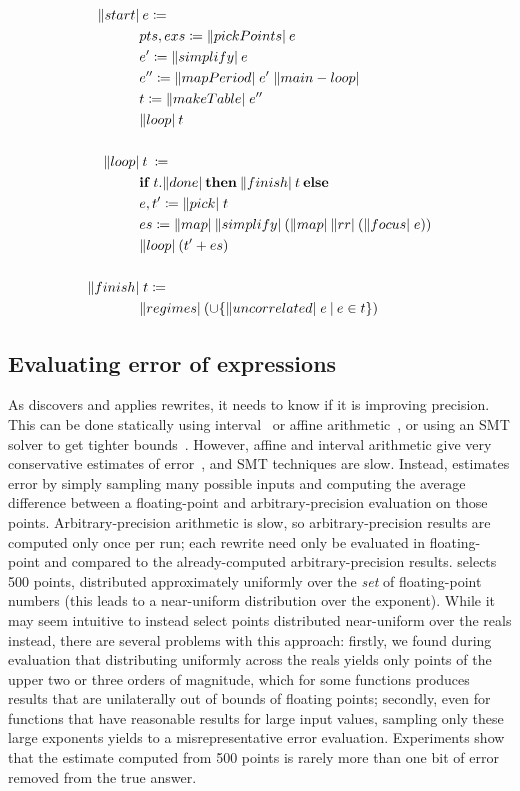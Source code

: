 \documentclass[paper.tex]{subfiles}
\begin{document}
\begin{figure}
\begin{align*}
  \|start| &\:e\coloneqq \\
  & pts, exs \coloneqq \|pickPoints|\:e \\
  & e' \coloneqq \|simplify|\:e \\
  & e'' \coloneqq \|mapPeriod|\;e'\;\|main-loop| \\
  & t \coloneqq \|makeTable|\;e''\\
  & \|loop|\:t\\
  \\
  \|loop| &\:t\:\coloneqq \\
  & \mathbf{if}\:t.\|done|\:\mathbf{then}\:\|finish|\:t\:\mathbf{else} \\
  & e, t' \coloneqq \|pick|\;t \\
  & es \coloneqq \|map|\:\|simplify|\:(\|map|\:\|rr|\:(\|focus|\;e)) \\
  & \|loop|\:(t' + es) \\
  \\
  \|finish| &\;t \coloneqq \\
  & \|regimes|\:(\cup\{\|uncorrelated|\;e \:|\: e \in t \})
\end{align*}

\end{figure}

\subsection{Evaluating error of expressions}

As \casio discovers and applies rewrites,
  it needs to know if it is improving precision.
This can be done statically using interval~\cite{} or affine arithmetic~\cite{},
  or using an SMT solver to get tighter bounds~\cite{}.
However, affine and interval arithmetic give
  very conservative estimates of error~\cite{},
  and SMT techniques are slow.
Instead, \casio estimates error by simply sampling many possible inputs
  and computing the average difference between a floating-point
  and arbitrary-precision evaluation on those points.
Arbitrary-precision arithmetic is slow,
  so arbitrary-precision results are computed only once per run;
  each rewrite need only be evaluated in floating-point
  and compared to the already-computed arbitrary-precision results.
\casio selects 500 points, distributed approximately uniformly
  over the \emph{set} of floating-point numbers
  (this leads to a near-uniform distribution over the exponent).
While it may seem intuitive to instead select points
  distributed near-uniform over the reals instead,
  there are several problems with this approach:
firstly, we found during evaluation
  that distributing uniformly across the reals
  yields only points of the upper two or three orders of magnitude,
  which for some functions produces results
  that are unilaterally out of bounds of floating points;
secondly, even for functions that have reasonable results for large input values,
  sampling only these large exponents yields to a misrepresentative error evaluation.
Experiments show that the estimate computed from 500 points
  is rarely more than one bit of error removed from the true answer.
\end{document}
